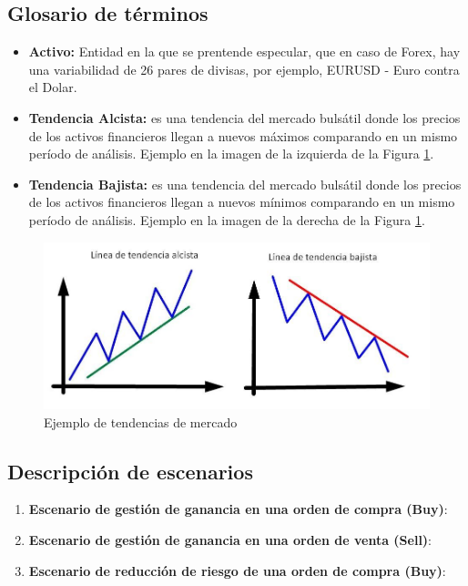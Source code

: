 \subsection{Glosario de términos}
\begin{itemize}
	\item \textbf{Activo:} Entidad en la que se prentende especular, que en caso de Forex, hay una variabilidad de 26 pares de divisas, por ejemplo, EURUSD - Euro contra el Dolar.
	\item \textbf{Tendencia Alcista:} es una tendencia del mercado bulsátil donde los precios de los activos financieros llegan a nuevos máximos comparando en un mismo período de análisis. Ejemplo en la imagen de la izquierda de la Figura \ref{fig:EjemploTentendias}.
	\item \textbf{Tendencia Bajista:} es una tendencia del mercado bulsátil donde los precios de los activos financieros llegan a nuevos mínimos comparando en un mismo período de análisis. Ejemplo en la imagen de la derecha de la Figura \ref{fig:EjemploTentendias}.
\end{itemize}

\begin{figure}[H]
	\centering
	\includegraphics[scale=0.50]{imagenes/EjemploTentendias.png}
	\caption{\label{fig:EjemploTentendias}Ejemplo de tendencias de mercado}
\end{figure}

\subsection{Descripción de escenarios}
\begin{enumerate}
	\item  \textbf{Escenario de gestión de ganancia en una orden de compra (Buy)}:
	\item  \textbf{Escenario de gestión de ganancia en una orden de venta (Sell)}:
	\item  \textbf{Escenario de reducción de riesgo de una orden de compra (Buy)}:
\end{enumerate}

